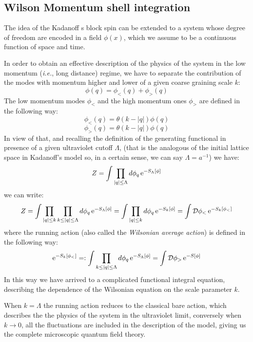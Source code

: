 \subsection{Wilson Momentum shell integration}
The idea of the Kadanoff s block spin can be extended to a system whose degree of freedom are encoded in a field $\phi(x)$,
which we assume to be a continuous function of space and time.

In order to obtain an effective description of the physics of the system in the low momentum (\emph{i.e.}, long distance) regime,
we have to separate the contribution of the modes with momentum higher and lower of a given coarse graining scale $k$:
\begin{equation}
\phi(q) = \phi_< (q) +\phi_> (q)
\end{equation}
The low momentum modes $\phi_<$ and the high momentum ones $\phi_>$ are defined in the following way:
\begin{equation}
 \phi_< (q) = \theta(k-|q|)\phi(q)
\end{equation}
\begin{equation}
\phi_> (q)= \theta(k-|q|)\phi(q)
\end{equation}
In view of that, and recalling the definition of the generating functional in presence of a given ultraviolet cutoff $\Lambda$,
(that is the analogous of the initial lattice space in Kadanoff's model so, in a certain sense, we can say  $\Lambda = a^{-1}$) we have:
\begin{equation}
  Z = \int \prod_{|q| \leq \Lambda}d\phi_q\operatorname{e}^{-S_\Lambda[\phi]} 
\end{equation}
we can write:
\begin{equation}
   Z = \int \prod_{|q| \leq k}\prod_{k\leq |q| \leq \Lambda}d\phi_q\operatorname{e}^{-S_\Lambda[\phi]} = \int \prod_{|q| \leq k }d\phi_q\operatorname{e}^{-S_k[\phi]}=   \int \mathcal{D} \phi_< \operatorname{e}^{-S_k[\phi_<]}
\end{equation}
where the running action (also called the \emph{Wilsonian average action}) is defined in the following way:
\begin{equation}
 \operatorname{e}^{-S_k[\phi_<]} = : \int  \prod_{k\leq |q| \leq \Lambda}d\phi_q\operatorname{e}^{-S_\Lambda[\phi]} =   \int \mathcal{D} \phi_> \operatorname{e}^{-S[\phi]}
\end{equation}
In this way we have arrived to a complicated functional integral equation, describing the dependence of the Wilsonian equation
on the scale parameter $k$. 

When $k=\Lambda$ the running action reduces to the classical bare action, which describes the 
the physics of the system in the ultraviolet limit, conversely when $k \to 0$, all the fluctuations are included in the description
of the model, giving us the complete microscopic quantum field theory.

